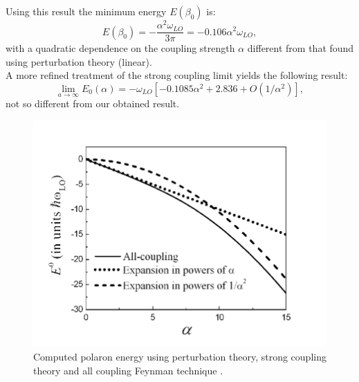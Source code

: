 Using this result the minimum energy $E(\beta_0)$ is:
\begin{equation}
    E(\beta_0)=-\frac{\alpha^2\omega_{LO}}{3\pi}=-0.106\alpha^2\omega_{LO},
\end{equation}
with a quadratic dependence on the coupling strength $\alpha$ different from that found using perturbation theory (linear).\\
A more refined treatment of the strong coupling limit \cite{miyake1976ground} yields the following result:
\begin{equation}
    \lim_{a\to\infty}E_0(\alpha)=-\omega_{LO}\left[-0.1085\alpha^2+2.836+O(1/\alpha^2)\right],
\end{equation}
not so different from our obtained result.
\begin{figure}[H]
    \centering
    \includegraphics[scale=1.0]{Feynman-polaron-energy-as-a-function-of-a-the-all-coupling-theory.png}
    \caption{Computed polaron energy using perturbation theory, strong coupling theory and all coupling 
    Feynman technique \cite{article_coupling}.}
    \label{fig:coupling_strength_Froehlich}
\end{figure}
